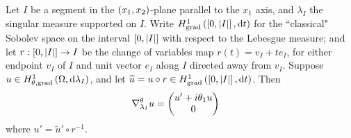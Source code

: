 \begin{lemma} \label{lem:TangentialQMGradientSegmentParallel}
	Let $I$ be a segment in the $\left( x_1,x_2 \right)$-plane parallel to the $x_1$ axis, and $\lambda_I$ the singular measure supported on $I$.
	Write $H^1_\mathrm{grad}\left( \left[ 0,\left\lvert I \right\rvert \right], \mathrm{d}t \right)$ for the ``classical" Sobolev space on the interval $\left[ 0,\left\lvert I \right\rvert \right]$ with respect to the Lebesgue measure; and let $r:\left[ 0,\left\lvert I \right\rvert \right]\rightarrow I$ be the change of variables map $r(t) = v_I + te_I$, for either endpoint $v_I$ of $I$ and unit vector $e_I$ along $I$ directed away from $v_I$.
	Suppose $u\in H^1_{\theta, \mathrm{grad}}\left( \Omega, \mathrm{d}\lambda_I \right)$, and let $\widetilde{u} = u\circ r\in H^1_\mathrm{grad}\left( \left[ 0,\left\lvert I \right\rvert \right], \mathrm{d}t \right)$.
	Then
	\begin{align*}
		\nabla_{\lambda_I}^\theta u &= \begin{pmatrix} u' + i\theta_1 u \\ 0	\end{pmatrix}
	\end{align*}
	where $u' = \widetilde{u}' \circ r^{-1}$.
\end{lemma}
